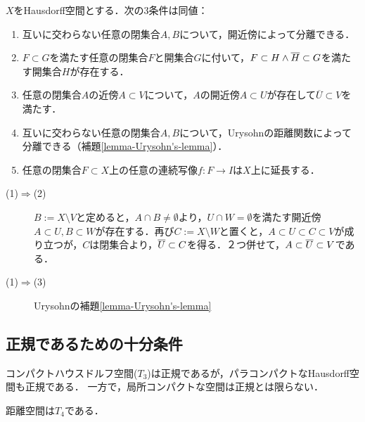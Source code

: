 \documentclass[uplatex,dvipdfmx]{jsreport}
\begin{document}
\begin{proposition}[正規性の特徴付け]\label{prop-characterizatioin-of-normality}
    $X$をHausdorff空間とする．次の3条件は同値：
    \begin{enumerate}
        \item 互いに交わらない任意の閉集合$A,B$について，開近傍によって分離できる．
        \item $F\subset G$を満たす任意の閉集合$F$と開集合$G$に付いて，$F\subset H\land \overline{H}\subset G$を満たす開集合$H$が存在する．
        \item 任意の閉集合$A$の近傍$A\subset V$について，$A$の開近傍$A\subset U$が存在して$\overline{U}\subset V$を満たす．
        \item 互いに交わらない任意の閉集合$A,B$について，Urysohnの距離関数によって分離できる（補題\ref{lemma-Urysohn's-lemma}）．
        \item 任意の閉集合$F\subset X$上の任意の連続写像$f:F\to I$は$X$上に延長する．
    \end{enumerate}
\end{proposition}
\begin{Proof}\mbox{}
    \begin{description}
        \item[(1)$\Rightarrow$(2)] 
        $B:=X\setminus V$と定めると，$A\cap B\ne\emptyset$より，$U\cap W=\emptyset$を満たす開近傍$A\subset U,B\subset W$が存在する．再び$C:=X\setminus W$と置くと，$A\subset U\subset C\subset V$が成り立つが，$C$は閉集合より，$\overline{U}\subset C$を得る．２つ併せて，$A\subset\overline{U}\subset V$である．
        \item[(1)$\Rightarrow$(3)] Urysohnの補題\ref{lemma-Urysohn's-lemma}

    \end{description}
\end{Proof}

\subsection{正規であるための十分条件}

\begin{proposition}
    コンパクトハウスドルフ空間($T_3$)は正規であるが，パラコンパクトなHausdorff空間も正規である．
    一方で，局所コンパクトな空間は正規とは限らない．
\end{proposition}

\begin{proposition}
    距離空間は$T_4$である．
\end{proposition}
\end{document}
